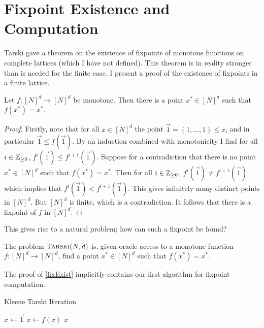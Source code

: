 \section{Fixpoint Existence and Computation}
Tarski gave a theorem on the existence of fixpoints of monotone functions on complete lattices\citep{tarski} (which I have not defined). This theorem
is in reality stronger than is needed for the finite case. I present a proof of the existence of fixpoints in a finite lattice.
\begin{theorem}\label{fixExist}
  Let $f : [N]^d \to [N]^d$ be monotone. Then there is a point $x^* \in [N]^d$ such that $f(x^*) = x^*$.
\end{theorem}
\begin{proof}
  Firstly, note that for all $x \in [N]^d$ the point $\vec{1} = (1, ..., 1) \leq x$, and in particular $\vec{1} \leq f(\vec{1})$.
  By an induction combined with monotonicity I find for all $i \in \mathbb{Z}_{\geq 0}$, $f^i (\vec{1}) \leq f^{i+1} (\vec{1})$. Suppose for a contradiction that there
  is no point $x^* \in [N]^d$ such that $f(x^*) = x^*$. Then for all $i \in \mathbb{Z}_{\geq 0}$, $f^i (\vec{1}) \neq f^{i+1}(\vec{1})$ which implies
  that $f^i (\vec{1}) < f^{i+1}(\vec{1})$. This gives infinitely many distinct points in $[N]^d$. But $[N]^d$ is finite, which is a contradiction.
  It follows that
  there is a fixpoint of $f$ in $[N]^d$.
\end{proof}
This gives rise to a natural problem; how can such a fixpoint be found?
\begin{definition}[$\trsk$]
  The problem $\textsc{Tarski}(N, d)$ is, given oracle access to a monotone function $f : [N]^d \to [N]^d$, find a point $x^* \in [N]^d$ such that $f(x^*) = x^*$.
\end{definition}
The proof of \cref{fixExist} implicitly contains our first algorithm for fixpoint computation.
\begin{algorithm}
  \caption{Kleene Tarski Iteration}
  \begin{algorithmic}[1]
  \State $x \gets \vec{1}$
    \State $x \gets f(x)$
  \EndWhile
  \Return $x$
  \EndProcedure
  \end{algorithmic}
\end{algorithm}

